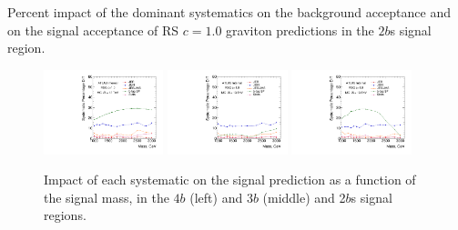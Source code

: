 
\begin{table}[htbp!]
\scriptsize
\begin{center}

\caption{Percent impact of the dominant systematics on the  background acceptance
         and on the signal acceptance of RS $c=1.0$ graviton predictions in the $2b$s signal region.}
\label{tab:summary-systematics-2b}
\end{center}
\end{table}

\begin{figure}[htbp!]
\begin{center}
\includegraphics[width=0.31\textwidth,angle=-90]{figures/boosted/Syst_MC/FourTag_RSG_syst.pdf}
\includegraphics[width=0.31\textwidth,angle=-90]{figures/boosted/Syst_MC/ThreeTag_RSG_syst.pdf}
\includegraphics[width=0.31\textwidth,angle=-90]{figures/boosted/Syst_MC/TwoTag_split_RSG_syst.pdf}
\caption{Impact of each systematic on the signal prediction as a function of the signal mass, in the $4b$ (left) and $3b$ (middle) and 2$b$s signal regions.}
\label{fig:signal_syst_summary}
\end{center}
\end{figure}

